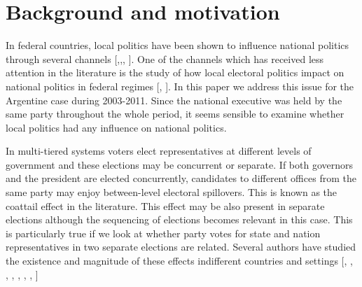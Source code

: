 \documentclass[a4paper,12pt]{article}
\begin{document}


\section{Background and motivation}

In federal countries, local politics have been shown to influence
national politics through several channels [\cite{jones97},\cite{cabrera98},\cite{oliveros},
\cite{samuels00}]. One of the channels which has received less
attention in the literature is the study of how local electoral
politics impact on national politics in federal regimes
[\cite{ames1994}, \cite{cabrera98}]. In this paper we address this
issue for the Argentine case during 2003-2011. Since the national
executive was held by the same party throughout the whole period, it
seems sensible to examine whether local politics had any influence on national politics.


In multi-tiered systems voters elect representatives at different
levels of government and these elections may be concurrent or
separate. If both governors and the president are elected
concurrently, candidates to different offices from the same party may
enjoy between-level electoral spillovers. This is known as the
coattail effect in the literature. This effect may be also present in
separate elections although the sequencing of elections becomes
relevant in this case. This is particularly true if we look at whether
party votes for state and nation representatives in two separate
elections are related. Several authors have studied the existence and magnitude of these effects indifferent countries and settings [\cite{calvert1983},
\cite{ferejohn1984}, \cite{ames1994}, \cite{samuels2000},
\cite{hogan2005}, \cite{oliveros}, \cite{magar2012}, \cite{meredith2013}]
\end{document}
